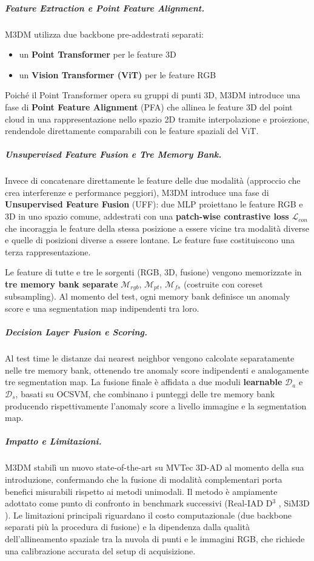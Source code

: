 \subparagraph{Feature Extraction e Point Feature Alignment.}
M3DM utilizza due backbone pre-addestrati separati:
\begin{itemize}
    \item un \textbf{Point Transformer} \cite{zhao2021point} per le feature 3D 
    \item un \textbf{Vision Transformer (ViT)} \cite{dosovitskiy2020image} per le feature RGB
\end{itemize}
    
Poiché il Point Transformer opera su gruppi di punti 3D, M3DM introduce una fase di \textbf{Point Feature Alignment} (PFA) che allinea le feature 3D del point cloud in una rappresentazione nello spazio 2D tramite interpolazione e proiezione, rendendole direttamente comparabili con le feature spaziali del ViT.

\subparagraph{Unsupervised Feature Fusion e Tre Memory Bank.}
Invece di concatenare direttamente le feature delle due modalità (approccio che crea interferenze e performance peggiori), M3DM introduce una fase di \textbf{Unsupervised Feature Fusion} (UFF): due MLP proiettano le feature RGB e 3D in uno spazio comune, addestrati con una \textbf{patch-wise contrastive loss} $\mathcal{L}_{con}$ che incoraggia le feature della stessa posizione a essere vicine tra modalità diverse e quelle di posizioni diverse a essere lontane. Le feature fuse costituiscono una terza rappresentazione.

Le feature di tutte e tre le sorgenti (RGB, 3D, fusione) vengono memorizzate in \textbf{tre memory bank separate} $\mathcal{M}_{rgb}$, $\mathcal{M}_{pt}$, $\mathcal{M}_{fs}$ (costruite con coreset subsampling). Al momento del test, ogni memory bank definisce un anomaly score e una segmentation map indipendenti tra loro.

\subparagraph{Decision Layer Fusion e Scoring.}
Al test time le distanze dai nearest neighbor vengono calcolate separatamente nelle tre memory bank, ottenendo tre anomaly score indipendenti e analogamente tre segmentation map. La fusione finale è affidata a due moduli \textbf{learnable} $\mathcal{D}_a$ e $\mathcal{D}_s$, basati su OCSVM, che combinano i punteggi delle tre memory bank producendo rispettivamente l'anomaly score a livello immagine e la segmentation map.

\subparagraph{Impatto e Limitazioni.}
M3DM stabilì un nuovo state-of-the-art su MV\-Tec 3D-AD al momento della sua introduzione, confermando che la fusione di mo\-da\-li\-tà complementari porta benefici misurabili rispetto ai metodi unimodali. Il metodo è ampiamente adottato come punto di confronto in benchmark successivi (Real-IAD D$^3$ \cite{zhu2025realiadd3}, SiM3D \cite{sim3d2025}). Le limitazioni principali riguardano il costo computazionale (due backbone separati più la procedura di fusione) e la dipendenza dalla qualità dell'allineamento spaziale tra la nuvola di punti e le immagini RGB, che richiede una calibrazione accurata del setup di acquisizione.

